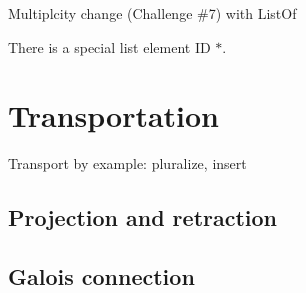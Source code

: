 \documentclass[english,submission]{programming}
\theoremstyle{definition}
\newcommand{\mathbox}[1]{\colorbox{black!10}{$#1$}}
\begin{document}
Multiplcity change (Challenge \#7) with ListOf


There is a special list element ID \mathbox{*}.







\section{Transportation}
Transport by example: pluralize, insert

\subsection{Projection and retraction}

\subsection{Galois connection}
\end{document}
